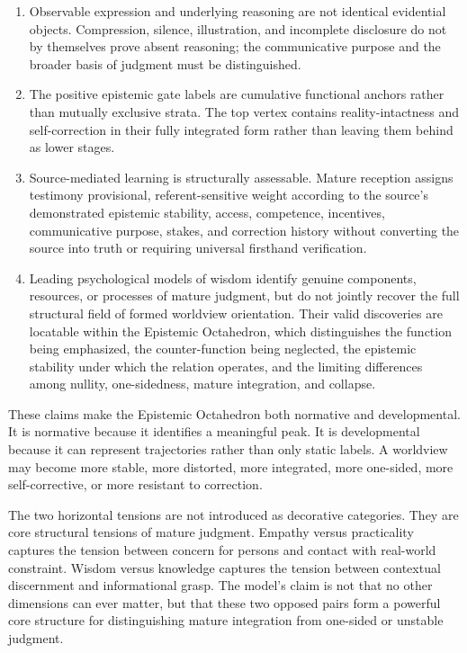 \documentclass[11pt]{article}
\begin{document}
\begin{enumerate}[label=\arabic*.]
    \item Observable expression and underlying reasoning are not identical evidential objects. Compression, silence, illustration, and incomplete disclosure do not by themselves prove absent reasoning; the communicative purpose and the broader basis of judgment must be distinguished.
    \item The positive epistemic gate labels are cumulative functional anchors rather than mutually exclusive strata. The top vertex contains reality-intactness and self-correction in their fully integrated form rather than leaving them behind as lower stages.
    \item Source-mediated learning is structurally assessable. Mature reception assigns testimony provisional, referent-sensitive weight according to the source's demonstrated epistemic stability, access, competence, incentives, communicative purpose, stakes, and correction history without converting the source into truth or requiring universal firsthand verification.
    \item Leading psychological models of wisdom identify genuine components, resources, or processes of mature judgment, but do not jointly recover the full structural field of formed worldview orientation. Their valid discoveries are locatable within the Epistemic Octahedron, which distinguishes the function being emphasized, the counter-function being neglected, the epistemic stability under which the relation operates, and the limiting differences among nullity, one-sidedness, mature integration, and collapse.
\end{enumerate}

These claims make the Epistemic Octahedron both normative and developmental. It is normative because it identifies a meaningful peak. It is developmental because it can represent trajectories rather than only static labels. A worldview may become more stable, more distorted, more integrated, more one-sided, more self-corrective, or more resistant to correction.

The two horizontal tensions are not introduced as decorative categories. They are core structural tensions of mature judgment. Empathy versus practicality captures the tension between concern for persons and contact with real-world constraint. Wisdom versus knowledge captures the tension between contextual discernment and informational grasp. The model's claim is not that no other dimensions can ever matter, but that these two opposed pairs form a powerful core structure for distinguishing mature integration from one-sided or unstable judgment.
\end{document}
